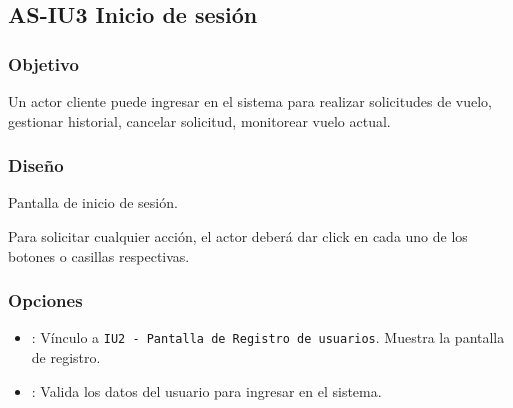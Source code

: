 %

\subsection{AS-IU3 Inicio de sesión}

\subsubsection{Objetivo}
	Un actor cliente puede ingresar en el sistema para realizar solicitudes
de vuelo, gestionar historial, cancelar solicitud, monitorear vuelo actual.

\subsubsection{Diseño}

{Pantalla de inicio de sesión.}

	Para solicitar cualquier acción, el actor deberá dar click en cada uno 
de los botones o casillas respectivas.

\subsubsection{Opciones}
\begin{itemize}
	\item {}: Vínculo a \texttt{IU2 - Pantalla de 
	Registro de usuarios}. Muestra la pantalla de registro.
	\item {}: Valida los datos del usuario para 
	ingresar en el sistema.
\end{itemize}
